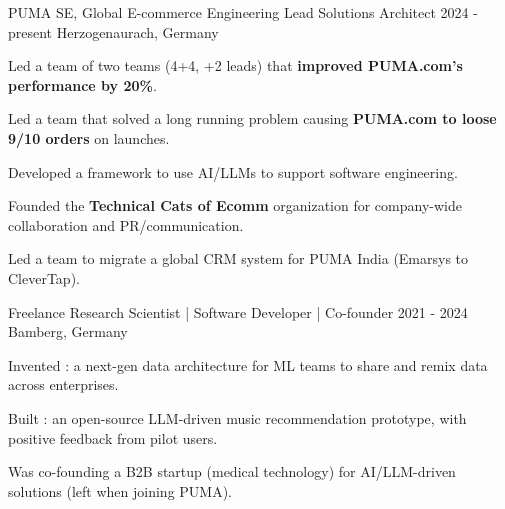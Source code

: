 {}

\vspace{2ex}

\begin{cventries}






    
        
  \cventry
    {PUMA SE, Global E-commerce Engineering}  %
    {Lead Solutions Architect} %
    {2024 - present} %
    {Herzogenaurach, Germany} %
    {
      \begin{cvitems} %
		\item {Led a team of two teams (4+4, +2 leads) that \textbf{improved PUMA.com's performance by 20\%}.}
		\item {Led a team that solved a long running problem causing \textbf{PUMA.com to loose 9/10 orders} on launches.}
		\item {Developed a framework to use AI/LLMs to support software engineering.}						
		\item {Founded the \textbf{Technical Cats of Ecomm} organization for company-wide collaboration and PR/communication.}
		\item {Led a team to migrate a global CRM system for PUMA India (Emarsys to CleverTap).}	
    \end{cvitems}
    }
    
\vspace{4ex}



    
        
  \cventry
    {Freelance}   %
    {Research Scientist | Software Developer | Co-founder} %
    {2021 - 2024} %
    {Bamberg, Germany} %
    {
      \begin{cvitems} %
		\item {Invented : a next-gen data architecture for ML teams to share and remix data across enterprises.}			
		\item {Built : an open-source LLM-driven music recommendation prototype, with positive feedback from pilot users.}
		\item {Was co-founding a B2B startup (medical technology) for AI/LLM-driven solutions (left when joining PUMA).}
    \end{cvitems}
    }
    

\end{cventries}
